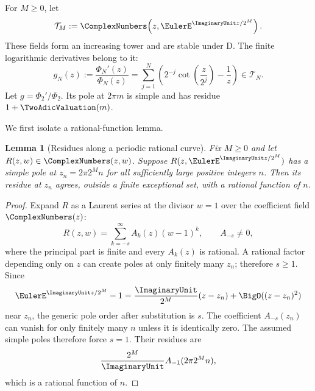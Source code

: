 \documentclass[11pt]{article}
\numberwithin{equation}{section}
\newtheorem{lemma}[theorem]{Lemma}
\theoremstyle{definition}
\theoremstyle{remark}
\newcommand{\D}{\mathrm D}
\begin{document}
For $M\ge0$, let
\begin{equation}
 \mathcal T_M:=\ComplexNumbers\!\left(z,\EulerE^{\ImaginaryUnit z/2^M}\right).
 \label{eq:trig-field}
\end{equation}
These fields form an increasing tower and are stable under $\D$.  The finite
logarithmic derivatives belong to it:
\begin{equation}
 g_N(z):=\frac{\Phi_N'(z)}{\Phi_N(z)}
 =\sum_{j=1}^{N}
 \left(2^{-j}\cot\!\left(\frac{z}{2^j}\right)-\frac1z\right)
 \in\mathcal T_N.
 \label{eq:finite-log-derivative}
\end{equation}
Let $g=\Phi_2'/\Phi_2$.  Its pole at $2\pi m$ is simple and has residue
$1+\TwoAdicValuation(m)$.

We first isolate a rational-function lemma.

\begin{lemma}[Residues along a periodic rational curve]
\label{lem:rational-residues}
Fix $M\ge0$ and let
$R(z,w)\in\ComplexNumbers(z,w)$.  Suppose $R(z,\EulerE^{\ImaginaryUnit z/2^M})$ has a simple pole at
$z_n=2\pi2^Mn$ for all sufficiently large positive integers $n$.  Then its
residue at $z_n$ agrees, outside a finite exceptional set, with a rational
function of $n$.
\end{lemma}
\begin{proof}
Expand $R$ as a Laurent series at the divisor $w=1$ over the coefficient field
$\ComplexNumbers(z)$:
\begin{equation}
 R(z,w)=\sum_{k=-s}^{\infty}A_k(z)(w-1)^k,
 \qquad A_{-s}\ne0,
 \label{eq:Laurent-w1}
\end{equation}
where the principal part is finite and every $A_k(z)$ is rational.  A rational
factor depending only on $z$ can create poles at only finitely many $z_n$;
therefore $s\ge1$.  Since
\begin{equation}
 \EulerE^{\ImaginaryUnit z/2^M}-1
 =\frac{\ImaginaryUnit}{2^M}(z-z_n)+\BigO((z-z_n)^2)
 \label{eq:exp-local}
\end{equation}
near $z_n$, the generic pole order after substitution is $s$.  The coefficient
$A_{-s}(z_n)$ can vanish for only finitely many $n$ unless it is identically
zero.  The assumed simple poles therefore force $s=1$.  Their residues are
\begin{equation}
 \frac{2^M}{\ImaginaryUnit}A_{-1}(2\pi2^Mn),
 \label{eq:rational-residue-n}
\end{equation}
which is a rational function of $n$.
\end{proof}
\end{document}
